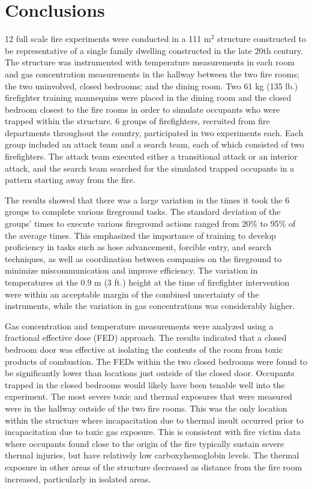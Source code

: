 \documentclass[12pt,oneside]{article}
\begin{document}
\section{Conclusions}

12 full scale fire experiments were conducted in a 111 m$^2$ structure constructed to be representative of a single family dwelling constructed in the late 20th century. The structure was instrumented with temperature measurements in each room and gas concentration measurements in the hallway between the two fire rooms; the two uninvolved, closed bedrooms; and the dining room. Two 61 kg (135 lb.) firefighter training mannequins were placed in the dining room and the closed bedroom closest to the fire rooms in order to simulate occupants who were trapped within the structure. 6 groups of firefighters, recruited from fire departments throughout the country, participated in two experiments each. Each group included an attack team and a search team, each of which consisted of two firefighters. The attack team executed either a transitional attack or an interior attack, and the search team searched for the simulated trapped occupants in a pattern starting away from the fire. 

The results showed that there was a large variation in the times it took the 6 groups to complete various fireground tasks. The standard deviation of the groups' times to execute various fireground actions ranged from 20\% to 95\% of the average times. This emphasized the importance of training to develop proficiency in tasks such as hose advancement, forcible entry, and search techniques, as well as coordination between companies on the fireground to minimize miscommunication and improve efficiency. The variation in temperatures at the 0.9 m (3 ft.) height at the time of firefighter intervention were within an acceptable margin of the combined uncertainty of the instruments, while the variation in gas concentrations was considerably higher. 

Gas concentration and temperature measurements were analyzed using a fractional effective dose (FED) approach. The results indicated that a closed bedroom door was effective at isolating the contents of the room from toxic products of combustion. The FEDs within the two closed bedrooms were found to be significantly lower than locations just outside of the closed door. Occupants trapped in the closed bedrooms would likely have been tenable well into the experiment. The most severe toxic and thermal exposures that were measured were in the hallway outside of the two fire rooms. This was the only location within the structure where incapacitation due to thermal insult occurred prior to incapacitation due to toxic gas exposure. This is consistent with fire victim data where occupants found close to the  origin of the fire typically sustain severe thermal injuries, but have relatively low carboxyhemoglobin levels. The thermal exposure in other areas of the structure decreased as distance from the fire room increased, particularly in isolated areas. 
\end{document}
